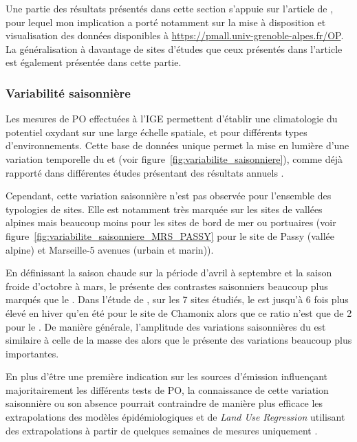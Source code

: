 \begin{tcolorbox}[colback=red!5!white,colframe=Melon,title=Note]
    Une partie des résultats présentés dans cette section s'appuie sur l'article de
    \cite{calasSeasonal2019}, pour lequel mon implication a porté notamment sur la mise à
    disposition et visualisation des données disponibles à
    \url{https://pmall.univ-grenoble-alpes.fr/OP}.\\
    La généralisation à davantage de sites d'études que ceux présentés dans l'article est
    également présentée dans cette partie.
\end{tcolorbox}

\subsubsection{Variabilité saisonnière}%
\label{ssub:variabilité_saisonnière}

Les mesures de PO effectuées à l'IGE permettent d'établir une climatologie du potentiel
oxydant sur une large échelle spatiale, et pour différents types d'environnements. Cette
base de données unique permet la mise en lumière d'une variation temporelle du \POAAv{} et
\PODTTv{} (voir figure~\ref{fig:variabilite_saisonniere}), comme déjà rapporté dans
différentes études présentant des résultats annuels
\autocite{fangOxidative2016,calasComparison2018,calasSeasonal2019,pietrograndePM102018}.

Cependant, cette variation saisonnière n'est pas observée pour l'ensemble des typologies
de sites. Elle est notamment très marquée sur les sites de vallées alpines mais beaucoup
moins pour les sites de bord de mer ou portuaires (voir
figure~\ref{fig:variabilite_saisonniere_MRS_PASSY} pour le site de Passy (vallée alpine)
et Marseille-5 avenues (urbain et marin)).

En définissant la saison chaude sur la période d'avril à septembre et la saison froide
d'octobre à mars, le \POAAv{} présente des contrastes saisonniers beaucoup plus marqués que
le \PODTTv. Dans l'étude de \cite[tableau 3]{calasSeasonal2019}, sur les 7 sites étudiés,
le \POAAv{} est jusqu'à 6 fois plus élevé en hiver qu'en été pour le site de Chamonix
alors que ce ratio n'est que de 2 pour le \PODTTv. De manière générale, l'amplitude des
variations saisonnières du \PODTTv{} est similaire à celle de la masse des \PMdix{} alors
que le \POAAv{} présente des variations beaucoup plus importantes.

En plus d'être une première indication sur les sources d'émission influençant
majoritairement les différents tests de PO, la connaissance de cette variation saisonnière
ou son absence pourrait contraindre de manière plus efficace les extrapolations des
modèles épidémiologiques et de \textit{Land Use Regression} utilisant des extrapolations à
partir de quelques semaines de mesures uniquement
\autocite{yangaileenSpatial2015,jedynskaSpatial2017}.

